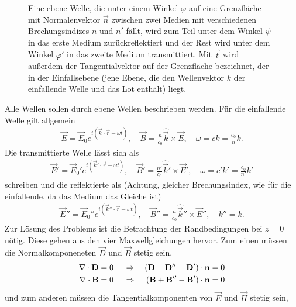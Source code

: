 \begin{figure}[htb]
    \centering
    \tfigReflectionRefractionPlaneWave
    \caption{Eine ebene Welle, die unter einem Winkel $\varphi$ auf eine Grenzfläche mit Normalenvektor $\vec n$ zwischen zwei Medien mit verschiedenen Brechungsindizes $n$ und $n'$ fällt,
        wird zum Teil unter dem Winkel $\psi$ in das erste Medium zurückreflektiert und der Rest wird unter dem Winkel $\varphi'$ in das zweite Medium transmittiert. Mit $\vec t$ wird außerdem der Tangentialvektor auf der Grenzfläche bezeichnet, der in der Einfallsebene (jene Ebene, die den Wellenvektor $k$ der einfallende Welle und das Lot enthält) liegt. }
    \label{fig:reflection_refraction_plane_wave}
\end{figure}

Alle Wellen sollen durch ebene Wellen beschrieben werden. Für die einfallende Welle gilt allgemein
\begin{align*}
    \vec E =\vec E_0 e^{i(\vec k\cdot\vec r-\omega t)}, \quad \vec B =\frac{n}{c_0}\hat{\vec k}\times\vec E, \quad\omega = ck=\frac{c_0}{n}k.
\end{align*}
Die transmittierte Welle lässt sich als
\begin{align*}
    \vec E' =\vec E_0' e^{i(\vec k'\cdot\vec r-\omega t)}, \quad \vec B'  =\frac{n'}{c_0}\hat{\vec k}'\times\vec E', \quad \omega = c'k'=\frac{c_0}{n'}k'
\end{align*}
schreiben und die reflektierte als (Achtung, gleicher Brechungsindex, wie für die einfallende, da das Medium das Gleiche ist)
\begin{align*}
    \vec E'' =\vec E_0'' e^{i(\vec k''\cdot\vec r-\omega t)}, \quad \vec B''  =\frac{n}{c_0}\hat{\vec k}''\times\vec E'', \quad k''  =k.
\end{align*}
Zur Lösung des Problems ist die Betrachtung der Randbedingungen bei $z=0$ nötig.
Diese gehen aus den vier Maxwellgleichungen hervor.
Zum einen müssen die Normalkomponeneten $\vec D$ und $\vec B$ stetig sein,
\begin{align}
    \label{eq:ebene_welle_RB_stetige_normalkomponenten}
    \begin{aligned}
        \nabla\cdot \mathbf{D} & =0 &  & \;\Rightarrow\; & \left(\mathbf{D}+\mathbf{D}''-\mathbf{D}'\right)\cdot \mathbf{n} & =0 \\
        \nabla\cdot \mathbf{B} & =0 &  & \;\Rightarrow\; & \left(\mathbf{B}+\mathbf{B}''-\mathbf{B}'\right)\cdot \mathbf{n} & =0
    \end{aligned}
\end{align}
und zum anderen müssen die Tangentialkomponenten von $\vec E$ und $\vec H$ stetig sein,
